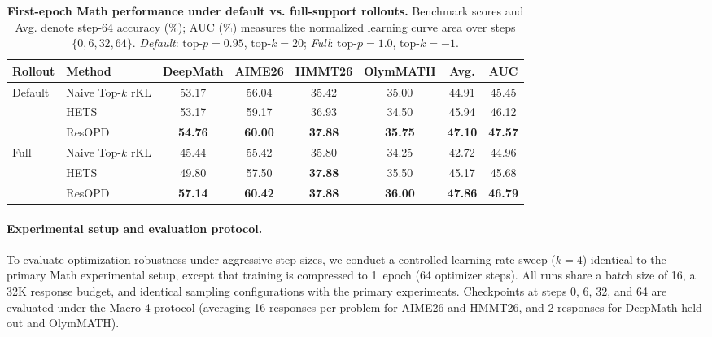 \begin{table}[t]
\centering
\small
\caption{\textbf{First-epoch Math performance under default vs. full-support rollouts.}
Benchmark scores and Avg. denote step-64 accuracy (\%); $\text{AUC}$ (\%) measures the normalized learning curve area over steps $\{0, 6, 32, 64\}$.
\textit{Default}: top-$p=0.95$, top-$k=20$; \textit{Full}: top-$p=1.0$, top-$k=-1$.}
\vspace{-2mm}
\label{tab:full-support-first-epoch}
\setlength{\tabcolsep}{5pt}
\renewcommand{\arraystretch}{1.15}
\begin{tabular}{llcccccc}
\toprule
\textbf{Rollout} & \textbf{Method} & \textbf{DeepMath} & \textbf{AIME26} & \textbf{HMMT26} & \textbf{OlymMATH} & \textbf{Avg.} & \textbf{AUC} \\
\midrule
\multirow{3}{*}{Default}
& Naive Top-$k$ rKL & 53.17 & 56.04 & 35.42 & 35.00 & 44.91 & 45.45 \\
& HETS              & 53.17 & 59.17 & 36.93 & 34.50 & 45.94 & 46.12 \\
& ResOPD            & \textbf{54.76} & \textbf{60.00} & \textbf{37.88} & \textbf{35.75} & \textbf{47.10} & \textbf{47.57} \\
\midrule
\multirow{3}{*}{Full}
& Naive Top-$k$ rKL & 45.44 & 55.42 & 35.80 & 34.25 & 42.72 & 44.96 \\
& HETS              & 49.80 & 57.50 & \textbf{37.88} & 35.50 & 45.17 & 45.68 \\
& ResOPD            & \textbf{57.14} & \textbf{60.42} & \textbf{37.88} & \textbf{36.00} & \textbf{47.86} & \textbf{46.79} \\
\bottomrule
\end{tabular}
\end{table}

\paragraph{Experimental setup and evaluation protocol.}
To evaluate optimization robustness under aggressive step sizes, we conduct a controlled learning-rate sweep ($k=4$) identical to the primary Math experimental setup, except that training is compressed to 1~epoch (64 optimizer steps). All runs share a batch size of 16, a 32K response budget, and identical sampling configurations with the primary experiments. Checkpoints at steps 0, 6, 32, and 64 are evaluated under the Macro-4 protocol (averaging 16 responses per problem for AIME26 and HMMT26, and 2 responses for DeepMath held-out and OlymMATH).
\vspace{-4mm}

